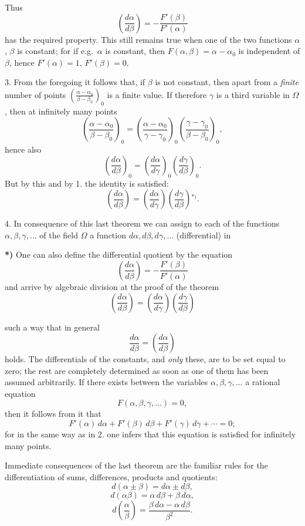 \documentclass{article}
\begin{document}
Thus
\[ \left(\frac{d\alpha}{d\beta}\right) = -\frac{F'(\beta)}{F'(\alpha)} \tag{1.} \]
has the required property. This still remains true when one of the two functions $\alpha$, $\beta$ is constant; for if e.g.\ $\alpha$ is constant, then $F(\alpha, \beta) = \alpha - \alpha_{0}$ is independent of $\beta$, hence $F'(\alpha) = 1$, $F'(\beta) = 0$.

3. From the foregoing it follows that, if $\beta$ is not constant, then apart from a \emph{finite} number of points $\left(\frac{\alpha-\alpha_{0}}{\beta-\beta_{0}}\right)_{0}$ is a finite value. If therefore $\gamma$ is a third variable in $\Omega$, then at infinitely many points
\[ \left(\frac{\alpha-\alpha_{0}}{\beta-\beta_{0}}\right)_{0} = \left(\frac{\alpha-\alpha_{0}}{\gamma-\gamma_{0}}\right)_{0}\left(\frac{\gamma-\gamma_{0}}{\beta-\beta_{0}}\right)_{0}, \]
hence also
\[ \left(\frac{d\alpha}{d\beta}\right)_{0} = \left(\frac{d\alpha}{d\gamma}\right)_{0}\left(\frac{d\gamma}{d\beta}\right)_{0}. \]
But by this and by 1. the identity is satisfied:
\[ \left(\frac{d\alpha}{d\beta}\right) = \left(\frac{d\alpha}{d\gamma}\right)\left(\frac{d\gamma}{d\beta}\right){}^{*)}. \tag{2.} \]

4. In consequence of this last theorem we can assign to each of the functions $\alpha, \beta, \gamma, \ldots$ of the field $\Omega$ a function $d\alpha, d\beta, d\gamma, \ldots$ (differential) in

\textbf{*)} One can also define the differential quotient by the equation
\[ \left(\frac{d\alpha}{d\beta}\right) = -\frac{F'(\beta)}{F'(\alpha)} \]
and arrive by algebraic division at the proof of the theorem
\[ \left(\frac{d\alpha}{d\beta}\right) = \left(\frac{d\alpha}{d\gamma}\right)\left(\frac{d\gamma}{d\beta}\right) \]

such a way that in general
\[ \frac{d\alpha}{d\beta} = \left(\frac{d\alpha}{d\beta}\right) \]
holds. The differentials of the constants, and \emph{only} these, are to be set equal to zero; the rest are completely determined as soon as one of them has been assumed arbitrarily. If there exists between the variables $\alpha, \beta, \gamma, \ldots$ a rational equation
\[ F(\alpha, \beta, \gamma, \ldots) = 0, \]
then it follows from it that
\[ F'(\alpha)\,d\alpha + F'(\beta)\,d\beta + F'(\gamma)\,d\gamma + \cdots = 0; \tag{3.} \]
for in the same way as in 2. one infers that this equation is satisfied for infinitely many points.

Immediate consequences of the last theorem are the familiar rules for the differentiation of sums, differences, products and quotients:
\[ d(\alpha \pm \beta) = d\alpha \pm d\beta, \tag{4.} \]
\[ d(\alpha\beta) = \alpha\,d\beta + \beta\,d\alpha, \tag{5.} \]
\[ d\left(\frac{\alpha}{\beta}\right) = \frac{\beta\,d\alpha - \alpha\,d\beta}{\beta^{2}}. \tag{6.} \]
\end{document}
